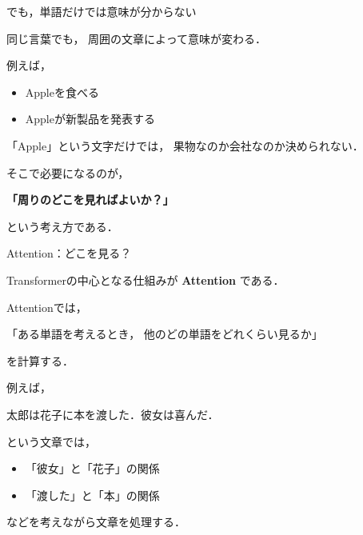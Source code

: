 \documentclass[aspectratio=169,professionalfonts]{beamer}
\begin{document}
\begin{frame}{でも，単語だけでは意味が分からない}

  同じ言葉でも，
  周囲の文章によって意味が変わる．

  \vspace{1em}

  例えば，

  \begin{itemize}
    \item Appleを食べる
    \item Appleが新製品を発表する
  \end{itemize}

  \vspace{1em}

  「Apple」という文字だけでは，
  果物なのか会社なのか決められない．

  \vspace{1em}

  そこで必要になるのが，

  \begin{center}
    \textbf{「周りのどこを見ればよいか？」}
  \end{center}

  という考え方である．


\end{frame}


\begin{frame}{Attention：どこを見る？}

  Transformerの中心となる仕組みが
  \textbf{Attention}
  である．

  \vspace{1em}

  Attentionでは，

  \begin{center}
    「ある単語を考えるとき，
    他のどの単語をどれくらい見るか」
  \end{center}

  を計算する．

  \vspace{1em}

  例えば，

  \begin{center}
    太郎は花子に本を渡した．彼女は喜んだ．
  \end{center}

  という文章では，

  \begin{itemize}
    \item 「彼女」と「花子」の関係
    \item 「渡した」と「本」の関係
  \end{itemize}

  などを考えながら文章を処理する．


\end{frame}
\end{document}
